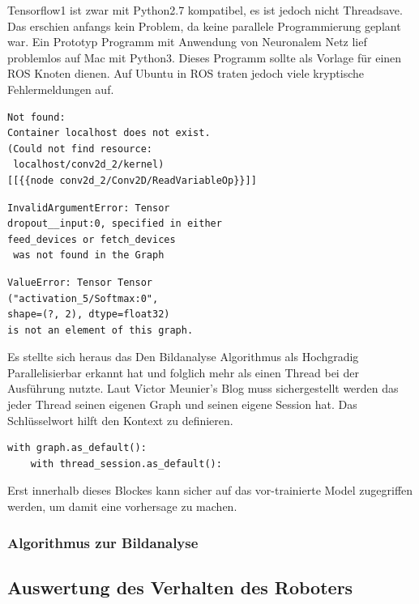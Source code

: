 \documentclass[conference]{IEEEtran}
\begin{document}
Tensorflow1 ist zwar mit Python2.7 kompatibel, es ist jedoch nicht Threadsave. Das erschien anfangs kein Problem, da keine parallele Programmierung geplant war. Ein Prototyp Programm mit Anwendung von Neuronalem Netz lief problemlos auf Mac mit Python3. Dieses Programm sollte als Vorlage für einen ROS Knoten dienen. Auf Ubuntu in ROS  traten jedoch viele kryptische Fehlermeldungen auf. 


\begin{verbatim}
Not found: 
Container localhost does not exist. 
(Could not find resource:
 localhost/conv2d_2/kernel)
[[{{node conv2d_2/Conv2D/ReadVariableOp}}]]
\end{verbatim}

\begin{verbatim}
InvalidArgumentError: Tensor 
dropout__input:0, specified in either 
feed_devices or fetch_devices
 was not found in the Graph
\end{verbatim}
\begin{verbatim}
ValueError: Tensor Tensor
("activation_5/Softmax:0",
shape=(?, 2), dtype=float32) 
is not an element of this graph.
\end{verbatim}

Es stellte sich heraus das %
Den Bildanalyse Algorithmus als Hochgradig Parallelisierbar erkannt hat und folglich mehr als einen Thread bei der Ausführung nutzte. 
Laut Victor Meunier's Blog %
muss sichergestellt werden das jeder Thread seinen eigenen Graph und seinen eigene Session hat.  Das Schlüsselwort  hilft den Kontext zu definieren. 

\begin{verbatim}
with graph.as_default():
	with thread_session.as_default():
\end{verbatim}
Erst innerhalb dieses Blockes kann sicher auf das vor-trainierte Model zugegriffen werden, um damit eine vorhersage zu machen.
\subsubsection{Algorithmus zur Bildanalyse }

\subsection {Auswertung des Verhalten des Roboters}	%
\end{document}
